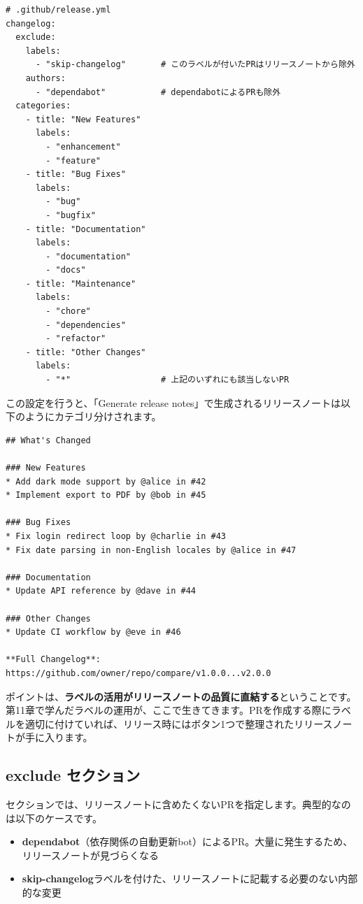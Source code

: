 \begin{lstlisting}[language={}]
# .github/release.yml
changelog:
  exclude:
    labels:
      - "skip-changelog"       # このラベルが付いたPRはリリースノートから除外
    authors:
      - "dependabot"           # dependabotによるPRも除外
  categories:
    - title: "New Features"
      labels:
        - "enhancement"
        - "feature"
    - title: "Bug Fixes"
      labels:
        - "bug"
        - "bugfix"
    - title: "Documentation"
      labels:
        - "documentation"
        - "docs"
    - title: "Maintenance"
      labels:
        - "chore"
        - "dependencies"
        - "refactor"
    - title: "Other Changes"
      labels:
        - "*"                  # 上記のいずれにも該当しないPR
\end{lstlisting}

この設定を行うと、「Generate release notes」で生成されるリリースノートは以下のようにカテゴリ分けされます。

\begin{lstlisting}[language={}]
## What's Changed

### New Features
* Add dark mode support by @alice in #42
* Implement export to PDF by @bob in #45

### Bug Fixes
* Fix login redirect loop by @charlie in #43
* Fix date parsing in non-English locales by @alice in #47

### Documentation
* Update API reference by @dave in #44

### Other Changes
* Update CI workflow by @eve in #46

**Full Changelog**: https://github.com/owner/repo/compare/v1.0.0...v2.0.0
\end{lstlisting}

ポイントは、\textbf{ラベルの活用がリリースノートの品質に直結する}ということです。第11章で学んだラベルの運用が、ここで生きてきます。PRを作成する際にラベルを適切に付けていれば、リリース時にはボタン1つで整理されたリリースノートが手に入ります。

\subsection{exclude セクション}

 セクションでは、リリースノートに含めたくないPRを指定します。典型的なのは以下のケースです。

\begin{itemize}
  \item \textbf{dependabot}（依存関係の自動更新bot）によるPR。大量に発生するため、リリースノートが見づらくなる
  \item \textbf{skip-changelog}ラベルを付けた、リリースノートに記載する必要のない内部的な変更
\end{itemize}


